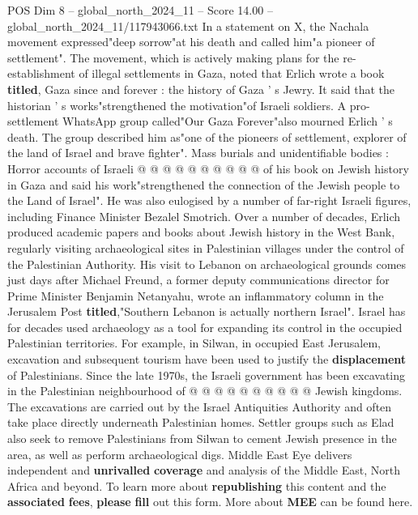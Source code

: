 \begin{textsample}{POS Dim 8 – global\_north\_2024\_11 – Score 14.00 – global\_north\_2024\_11/117943066.txt}
In a statement on X, the Nachala movement expressed"deep sorrow"at his death and called him"a pioneer of settlement".
The movement, which is actively making plans for the re-establishment of illegal settlements in Gaza, noted that Erlich wrote a book \textbf{titled}, Gaza since and forever : the history of Gaza ' s Jewry.
It said that the historian ' s works"strengthened the motivation"of Israeli soldiers.
A pro-settlement WhatsApp group called"Our Gaza Forever"also mourned Erlich ' s death.
The group described him as"one of the pioneers of settlement, explorer of the land of Israel and brave fighter".
Mass burials and unidentifiable bodies : Horror accounts of Israeli @ @ @ @ @ @ @ @ @ @ of his book on Jewish history in Gaza and said his work"strengthened the connection of the Jewish people to the Land of Israel".
He was also eulogised by a number of far-right Israeli figures, including Finance Minister Bezalel Smotrich.
Over a number of decades, Erlich produced academic papers and books about Jewish history in the West Bank, regularly visiting archaeological sites in Palestinian villages under the control of the Palestinian Authority.
His visit to Lebanon on archaeological grounds comes just days after Michael Freund, a former deputy communications director for Prime Minister Benjamin Netanyahu, wrote an inflammatory column in the Jerusalem Post \textbf{titled},"Southern Lebanon is actually northern Israel".
Israel has for decades used archaeology as a tool for expanding its control in the occupied Palestinian territories.
For example, in Silwan, in occupied East Jerusalem, excavation and subsequent tourism have been used to justify the \textbf{displacement} of Palestinians.
Since the late 1970s, the Israeli government has been excavating in the Palestinian neighbourhood of @ @ @ @ @ @ @ @ @ @ Jewish kingdoms.
The excavations are carried out by the Israel Antiquities Authority and often take place directly underneath Palestinian homes.
Settler groups such as Elad also seek to remove Palestinians from Silwan to cement Jewish presence in the area, as well as perform archaeological digs.
Middle East Eye delivers independent and \textbf{unrivalled} \textbf{coverage} and analysis of the Middle East, North Africa and beyond.
To learn more about \textbf{republishing} this content and the \textbf{associated} \textbf{fees}, \textbf{please} \textbf{fill} out this form.
More about \textbf{MEE} can be found here.

\end{textsample}

